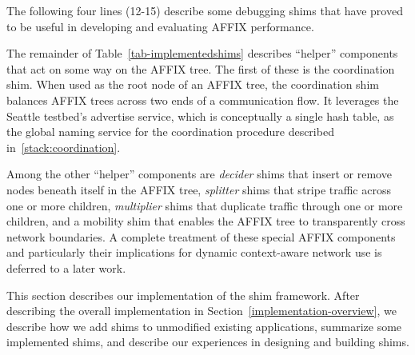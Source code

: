 The following four lines (12-15) describe some debugging shims that have proved to be useful 
in developing and evaluating AFFIX performance. 

The remainder of Table~\ref{tab-implementedshims} describes ``helper'' components
that act on some way on the AFFIX tree. The first of these is the coordination shim. 
When used as the root node of an AFFIX tree, the coordination 
shim balances AFFIX trees across two ends of a communication flow.
It leverages the Seattle testbed's advertise service, which is conceptually 
a single hash table,  as the
global naming service for the coordination procedure described in~\ref{stack:coordination}.

Among the other ``helper'' components are \emph{decider} shims
that insert or remove nodes beneath itself in the AFFIX tree, \emph{splitter} shims
that stripe traffic across one or more children, \emph{multiplier} shims
that duplicate traffic through one or more children, and a mobility shim that 
enables the AFFIX tree to transparently cross network boundaries.
A complete treatment of these special AFFIX components and particularly their implications 
for dynamic context-aware network use is deferred to a later work. 


\fi


\iffalse
This section describes our implementation of the shim framework.  After describing the overall implementation in Section~\ref{implementation-overview}, we describe how we add shims to unmodified existing applications, summarize some implemented shims, and describe our experiences in designing and building shims.
 


